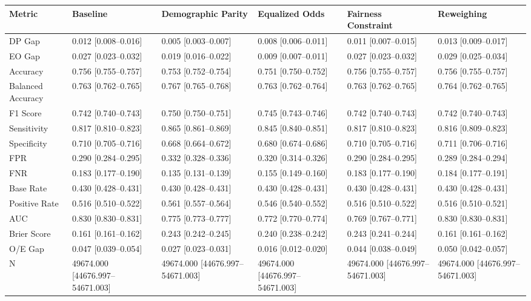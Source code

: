 \begin{tabular}{llllll}
\toprule
Metric & Baseline & Demographic Parity & Equalized Odds & Fairness Constraint & Reweighing \\
\midrule
DP Gap & 0.012 [0.008--0.016] & 0.005 [0.003--0.007] & 0.008 [0.006--0.011] & 0.011 [0.007--0.015] & 0.013 [0.009--0.017] \\
EO Gap & 0.027 [0.023--0.032] & 0.019 [0.016--0.022] & 0.009 [0.007--0.011] & 0.027 [0.023--0.032] & 0.029 [0.025--0.034] \\
Accuracy & 0.756 [0.755--0.757] & 0.753 [0.752--0.754] & 0.751 [0.750--0.752] & 0.756 [0.755--0.757] & 0.756 [0.755--0.757] \\
Balanced Accuracy & 0.763 [0.762--0.765] & 0.767 [0.765--0.768] & 0.763 [0.762--0.764] & 0.763 [0.762--0.765] & 0.764 [0.762--0.765] \\
F1 Score & 0.742 [0.740--0.743] & 0.750 [0.750--0.751] & 0.745 [0.743--0.746] & 0.742 [0.740--0.743] & 0.742 [0.740--0.743] \\
Sensitivity & 0.817 [0.810--0.823] & 0.865 [0.861--0.869] & 0.845 [0.840--0.851] & 0.817 [0.810--0.823] & 0.816 [0.809--0.823] \\
Specificity & 0.710 [0.705--0.716] & 0.668 [0.664--0.672] & 0.680 [0.674--0.686] & 0.710 [0.705--0.716] & 0.711 [0.706--0.716] \\
FPR & 0.290 [0.284--0.295] & 0.332 [0.328--0.336] & 0.320 [0.314--0.326] & 0.290 [0.284--0.295] & 0.289 [0.284--0.294] \\
FNR & 0.183 [0.177--0.190] & 0.135 [0.131--0.139] & 0.155 [0.149--0.160] & 0.183 [0.177--0.190] & 0.184 [0.177--0.191] \\
Base Rate & 0.430 [0.428--0.431] & 0.430 [0.428--0.431] & 0.430 [0.428--0.431] & 0.430 [0.428--0.431] & 0.430 [0.428--0.431] \\
Positive Rate & 0.516 [0.510--0.522] & 0.561 [0.557--0.564] & 0.546 [0.540--0.552] & 0.516 [0.510--0.522] & 0.516 [0.510--0.521] \\
AUC & 0.830 [0.830--0.831] & 0.775 [0.773--0.777] & 0.772 [0.770--0.774] & 0.769 [0.767--0.771] & 0.830 [0.830--0.831] \\
Brier Score & 0.161 [0.161--0.162] & 0.243 [0.242--0.245] & 0.240 [0.238--0.242] & 0.243 [0.241--0.244] & 0.161 [0.161--0.162] \\
O/E Gap & 0.047 [0.039--0.054] & 0.027 [0.023--0.031] & 0.016 [0.012--0.020] & 0.044 [0.038--0.049] & 0.050 [0.042--0.057] \\
N & 49674.000 [44676.997--54671.003] & 49674.000 [44676.997--54671.003] & 49674.000 [44676.997--54671.003] & 49674.000 [44676.997--54671.003] & 49674.000 [44676.997--54671.003] \\

\end{tabular}
